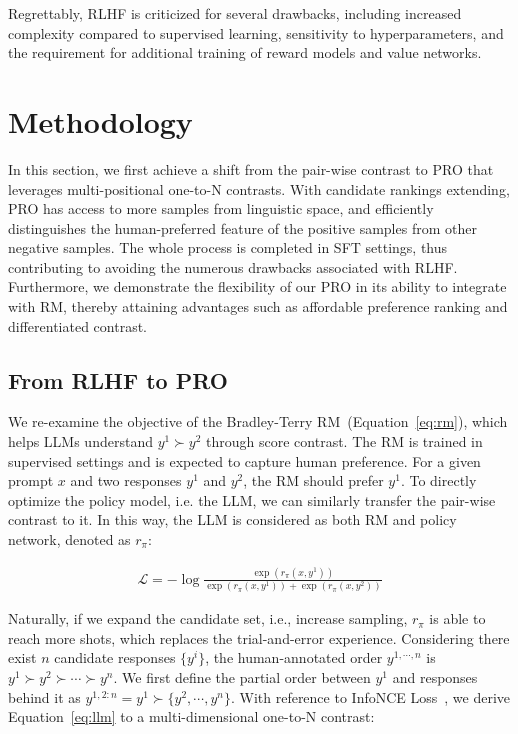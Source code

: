 Regrettably, RLHF is criticized for several drawbacks, including increased complexity compared to supervised learning, sensitivity to hyperparameters, and the requirement for additional training of reward models and value networks.

\section{Methodology}
In this section, we first achieve a shift from the pair-wise contrast to PRO that leverages multi-positional one-to-N contrasts. With candidate rankings extending, PRO has access to more samples from linguistic space, and efficiently distinguishes the human-preferred feature of the positive samples from other negative samples. The whole process is completed in SFT settings, thus contributing to avoiding the numerous drawbacks associated with RLHF. Furthermore, we demonstrate the flexibility of our PRO in its ability to integrate with RM, thereby attaining advantages such as affordable preference ranking and differentiated contrast.

\subsection{From RLHF to PRO} We re-examine the objective of the Bradley-Terry RM~(Equation~\ref{eq:rm}), which helps LLMs understand $y^1\succ y^2$ through score contrast. The RM is trained in supervised settings and is expected to capture human preference. For a given prompt $x$ and two responses $y^1$ and $y^2$, the RM should prefer $y^1$. To directly optimize the policy model, i.e. the LLM, we can similarly transfer the pair-wise contrast to it. In this way, the LLM is considered as both RM and policy network, denoted as $r_{\pi}$:

\begin{equation}
\begin{aligned}
\label{eq:llm}
\mathcal{L} = -\log \frac{\exp\left( r_{\pi}(x, y^1)\right)}{\exp\left(r_{\pi}(x, y^1)\right) + \exp\left( r_{\pi}(x, y^2)\right)}
\end{aligned}
\end{equation}

Naturally, if we expand the candidate set, i.e., increase sampling, $r_{\pi}$ is able to reach more shots, which replaces the trial-and-error experience. Considering there exist $n$ candidate responses $\{y^i\}$, the human-annotated order $y^{1, \cdots, n}$ is $y^1\succ y^2\succ \cdots \succ y^n$. We first define the partial order between $y^1$ and responses behind it as $y^{1,2:n} = y^1\succ\{ y^2, \cdots, y^n\}$. With reference to InfoNCE Loss~\cite{He_2020_CVPR}, we derive Equation~\ref{eq:llm} to a multi-dimensional one-to-N contrast:

